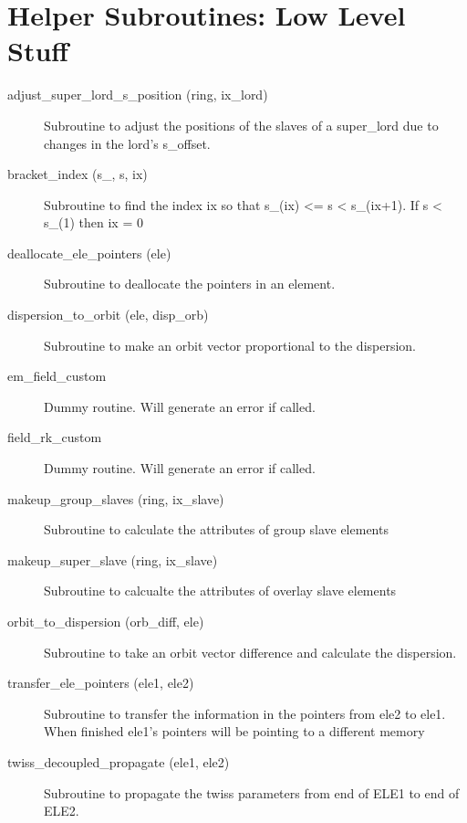 \section{Helper Subroutines: Low Level Stuff}
\label{r:low_help} 

\begin{description}

\item[adjust\_super\_lord\_s\_position (ring, ix\_lord)] \Newline
Subroutine to adjust the positions of the slaves of a 
super\_lord due to changes in the lord's s\_offset. 

\item[bracket\_index (s\_, s, ix)] \Newline
Subroutine to find the index ix so that s\_(ix) <= s < s\_(ix+1). 
If s < s\_(1) then ix = 0 

\item[deallocate\_ele\_pointers (ele)] \Newline
Subroutine to deallocate the pointers in an element. 

\item[dispersion\_to\_orbit (ele, disp\_orb)] \Newline
Subroutine to make an orbit vector proportional to the dispersion. 

\item[em\_field\_custom] \Newline
Dummy routine. Will generate an error if called. 

\item[field\_rk\_custom] \Newline
Dummy routine. Will generate an error if called. 

\item[makeup\_group\_slaves (ring, ix\_slave)] \Newline
Subroutine to calculate the attributes of group slave elements 

\item[makeup\_super\_slave (ring, ix\_slave)] \Newline
Subroutine to calcualte the attributes of overlay slave elements 

\item[orbit\_to\_dispersion (orb\_diff, ele)] \Newline
Subroutine to take an orbit vector difference and calculate the dispersion. 

\item[transfer\_ele\_pointers (ele1, ele2)] \Newline
Subroutine to transfer the information in the pointers from ele2 to ele1. 
When finished ele1's pointers will be pointing to a different memory 

\item[twiss\_decoupled\_propagate (ele1, ele2)] \Newline
Subroutine to propagate the twiss parameters from end of ELE1 to end of ELE2. 

\end{description}

